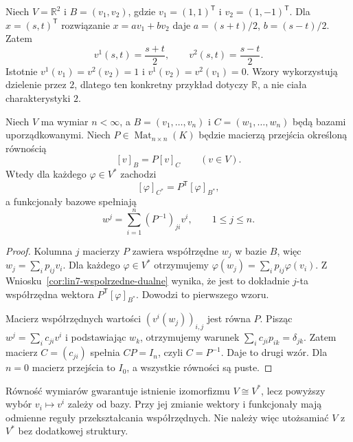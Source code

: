 \begin{przyklad}
\label{prz:lin7-baza-dualna-r2}
Niech \(V=\mathbb R^2\) i
\(B=(v_1,v_2)\), gdzie
\(v_1=(1,1)^{\mathsf T}\) i
\(v_2=(1,-1)^{\mathsf T}\).
Dla \(x=(s,t)^{\mathsf T}\) rozwiązanie
\(x=av_1+bv_2\) daje
\(a=(s+t)/2\), \(b=(s-t)/2\).
Zatem
\[
 v^1(s,t)=\frac{s+t}{2},\qquad
 v^2(s,t)=\frac{s-t}{2}.
\]
Istotnie \(v^1(v_1)=v^2(v_2)=1\)
i \(v^1(v_2)=v^2(v_1)=0\).
Wzory wykorzystują dzielenie przez
\(2\), dlatego ten konkretny przykład
dotyczy \(\mathbb R\), a nie ciała
charakterystyki \(2\).
\end{przyklad}

\begin{twierdzenie}
\label{thm:lin7-zmiana-bazy-dualnej}
Niech \(V\) ma wymiar \(n<\infty\),
a \(B=(v_1,\ldots,v_n)\) i
\(C=(w_1,\ldots,w_n)\) będą bazami
uporządkowanymi. Niech \(P\in
\operatorname{Mat}_{n\times n}(K)\)
będzie macierzą przejścia określoną
równością
\[
 [v]_B=P[v]_C\qquad(v\in V).
\]
Wtedy dla każdego \(\varphi\in V^*\)
zachodzi
\[
 [\varphi]_{C^*}=P^{\mathsf T}
 [\varphi]_{B^*},
\]
a funkcjonały bazowe spełniają
\[
 w^j=\sum_{i=1}^n (P^{-1})_{ji}v^i,
 \qquad 1\leq j\leq n.
\]
\end{twierdzenie}
\begin{proof}
Kolumna \(j\) macierzy \(P\)
zawiera współrzędne \(w_j\) w bazie
\(B\), więc
\(w_j=\sum_i p_{ij}v_i\).
Dla każdego \(\varphi\in V^*\)
otrzymujemy
\(\varphi(w_j)=\sum_i p_{ij}\varphi(v_i)\).
Z
Wniosku~\ref{cor:lin7-wspolrzedne-dualne}
wynika, że jest to dokładnie
\(j\)-ta współrzędna wektora
\(P^{\mathsf T}[\varphi]_{B^*}\).
Dowodzi to pierwszego wzoru.

Macierz współrzędnych wartości
\((v^i(w_j))_{i,j}\) jest równa \(P\).
Pisząc \(w^j=\sum_i c_{ji}v^i\)
i podstawiając \(w_k\), otrzymujemy
warunek
\(\sum_i c_{ji}p_{ik}=\delta_{jk}\).
Zatem macierz \(C=(c_{ji})\)
spełnia \(CP=I_n\), czyli
\(C=P^{-1}\). Daje to drugi wzór.
Dla \(n=0\) macierz przejścia to
\(I_0\), a wszystkie równości są puste.
\end{proof}

\begin{uwaga}
\label{rem:lin7-niekanoniczna}
Równość wymiarów gwarantuje
istnienie izomorfizmu \(V\cong V^*\),
lecz powyższy wybór
\(v_i\mapsto v^i\) zależy od bazy.
Przy jej zmianie wektory
i funkcjonały mają odmienne reguły
przekształcania współrzędnych.
Nie należy więc utożsamiać
\(V\) z \(V^*\) bez dodatkowej struktury.
\end{uwaga}

